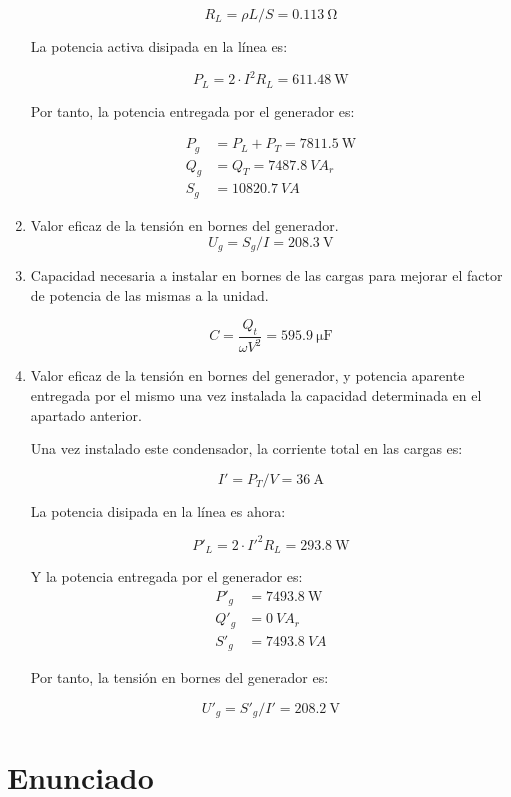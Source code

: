 \begin{enumerate}
\[
R_L = \rho L/S = \qty{0.113}{\ohm}
\]

La potencia activa disipada en la línea es:

\[
P_L = 2 \cdot I^2 R_L = \qty{611.48}{\watt}
\]

Por tanto, la potencia entregada por el generador es:

\begin{align*}
P_g &= P_L + P_T = \qty{7811.5}{\watt}\\
Q_g &= Q_T = \qty{7487.8}{VA}_r\\
S_g &= \qty{10820.7}{VA}
\end{align*}

\item Valor eficaz de la tensión en bornes del generador.
\[
U_g = S_g / I = \qty{208.3}{\volt}
\]

\item Capacidad necesaria a instalar en bornes de las cargas para
  mejorar el factor de potencia de las mismas a la unidad.

  \[
C = \frac{Q_t}{\omega V^2} = \qty{595.9}{\micro\farad}
\]


\item Valor eficaz de la tensión en bornes del generador, y potencia
  aparente entregada por el mismo una vez instalada la capacidad
  determinada en el apartado anterior.

  Una vez instalado este condensador, la corriente total en las cargas es:

\[
I' = P_T / V = \qty{36}{\ampere}
\]

La potencia disipada en la línea es ahora:

\[
P'_L = 2 \cdot I'^2 R_L = \qty{293.8}{\watt} 
\]

Y la potencia entregada por el generador es:
\begin{align*}
P'_g &= \qty{7493.8}{\watt}\\
Q'_g &= \qty{0}{VA}_r\\
S'_g &= \qty{7493.8}{VA}
\end{align*}

Por tanto, la tensión en bornes del generador es:

\[
U'_g = S'_g / I' = \qty{208.2}{\volt}
\]

\end{enumerate}

\section{Enunciado}


